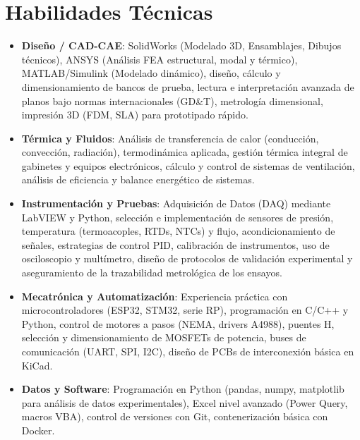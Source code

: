 \documentclass[10pt,letterpaper]{article}
\newcommand{\CVItem}[1]{\item #1}
\begin{document}
\section*{Habilidades Técnicas}
\begin{itemize}[leftmargin=*, itemsep=0.2ex]
    \CVItem{\textbf{Diseño / CAD-CAE}: SolidWorks (Modelado 3D, Ensamblajes, Dibujos técnicos), ANSYS (Análisis FEA estructural, modal y térmico), MATLAB/Simulink (Modelado dinámico), diseño, cálculo y dimensionamiento de bancos de prueba, lectura e interpretación avanzada de planos bajo normas internacionales (GD\&T), metrología dimensional, impresión 3D (FDM, SLA) para prototipado rápido.}
    \CVItem{\textbf{Térmica y Fluidos}: Análisis de transferencia de calor (conducción, convección, radiación), termodinámica aplicada, gestión térmica integral de gabinetes y equipos electrónicos, cálculo y control de sistemas de ventilación, análisis de eficiencia y balance energético de sistemas.}
    \CVItem{\textbf{Instrumentación y Pruebas}: Adquisición de Datos (DAQ) mediante LabVIEW y Python, selección e implementación de sensores de presión, temperatura (termoacoples, RTDs, NTCs) y flujo, acondicionamiento de señales, estrategias de control PID, calibración de instrumentos, uso de osciloscopio y multímetro, diseño de protocolos de validación experimental y aseguramiento de la trazabilidad metrológica de los ensayos.}
    \CVItem{\textbf{Mecatrónica y Automatización}: Experiencia práctica con microcontroladores (ESP32, STM32, serie RP), programación en C/C++ y Python, control de motores a pasos (NEMA, drivers A4988), puentes H, selección y dimensionamiento de MOSFETs de potencia, buses de comunicación (UART, SPI, I2C), diseño de PCBs de interconexión básica en KiCad.}
    \CVItem{\textbf{Datos y Software}: Programación en Python (pandas, numpy, matplotlib para análisis de datos experimentales), Excel nivel avanzado (Power Query, macros VBA), control de versiones con Git, contenerización básica con Docker.}
\end{itemize}
\end{document}
